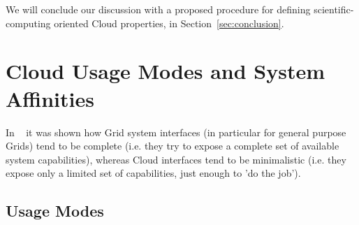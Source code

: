 \documentclass{article}
\newcommand{\amnote}[1]{   {\textcolor{magenta}{ ***Andre:    #1 }}}
\newcommand{\amnote}[1]{}
\newcommand{\up}{\vspace*{-1em}}
\begin{document}
% 

% 

We will conclude our discussion with a proposed procedure for defining
scientific-computing oriented Cloud properties, in
Section~\ref{sec:conclusion}.


\up
\section{Cloud Usage Modes and System Affinities}
\label{sec:affine}
 
In ~\cite{cloud-saga-paper} it was shown how Grid system interfaces
(in particular for general purpose Grids) tend to be complete
(i.e. they try to expose a complete set of available system
capabilities), whereas Cloud interfaces tend to be minimalistic
(i.e. they expose only a limited set of capabilities, just enough to
'do the job').
 
 \up
 \subsection{Usage Modes}
\end{document}
